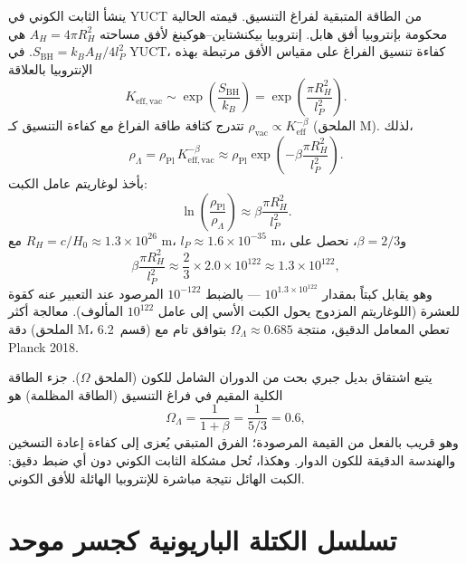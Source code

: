 \documentclass[12pt,a4paper]{article}
\begin{document}
	ينشأ الثابت الكوني في YUCT من الطاقة المتبقية لفراغ التنسيق. قيمته الحالية محكومة بإنتروبيا أفق هابل. إنتروبيا بيكنشتاين–هوكينغ لأفق مساحته \(A_H = 4\pi R_H^2\) هي \(S_{\mathrm{BH}} = k_B A_H / 4l_P^2\). في YUCT، كفاءة تنسيق الفراغ على مقياس الأفق مرتبطة بهذه الإنتروبيا بالعلاقة
	\begin{equation}
		K_{\mathrm{eff, vac}} \sim \exp\left( \frac{S_{\mathrm{BH}}}{k_B} \right) = \exp\left( \frac{\pi R_H^2}{l_P^2} \right).
	\end{equation}
	تتدرج كثافة طاقة الفراغ مع كفاءة التنسيق كـ \(\rho_{\mathrm{vac}} \propto K_{\mathrm{eff}}^{-\beta}\) (الملحق M). لذلك،
	\begin{equation}
		\rho_\Lambda = \rho_{\mathrm{Pl}} \, K_{\mathrm{eff, vac}}^{-\beta} \approx \rho_{\mathrm{Pl}} \exp\left( -\beta \frac{\pi R_H^2}{l_P^2} \right).
		\label{eq:lambda-suppression}
	\end{equation}
	بأخذ لوغاريتم عامل الكبت:
	\begin{equation}
		\ln\left( \frac{\rho_{\mathrm{Pl}}}{\rho_\Lambda} \right) \approx \beta \frac{\pi R_H^2}{l_P^2}.
	\end{equation}
	مع \(R_H = c / H_0 \approx 1.3 \times 10^{26}\) m، \(l_P \approx 1.6 \times 10^{-35}\) m، و\(\beta = 2/3\)، نحصل على
	\begin{equation}
		\beta \frac{\pi R_H^2}{l_P^2} \approx \frac{2}{3} \times 2.0 \times 10^{122} \approx 1.3 \times 10^{122},
	\end{equation}
	وهو يقابل كبتاً بمقدار \(10^{1.3 \times 10^{122}}\) — بالضبط \(10^{-122}\) المرصود عند التعبير عنه كقوة للعشرة (اللوغاريتم المزدوج يحول الكبت الأسي إلى عامل \(10^{122}\) المألوف). معالجة أكثر دقة (الملحق M، قسم~6.2) تعطي المعامل الدقيق، منتجة \(\Omega_\Lambda \approx 0.685\) بتوافق تام مع Planck 2018.
	
	يتبع اشتقاق بديل جبري بحت من الدوران الشامل للكون (الملحق \(\Omega\)). جزء الطاقة الكلية المقيم في فراغ التنسيق (الطاقة المظلمة) هو
	\begin{equation}
		\Omega_\Lambda = \frac{1}{1+\beta} = \frac{1}{5/3} = 0.6,
	\end{equation}
	وهو قريب بالفعل من القيمة المرصودة؛ الفرق المتبقي يُعزى إلى كفاءة إعادة التسخين والهندسة الدقيقة للكون الدوار. وهكذا، تُحل مشكلة الثابت الكوني دون أي ضبط دقيق: الكبت الهائل نتيجة مباشرة للإنتروبيا الهائلة للأفق الكوني.
	
	\section{تسلسل الكتلة الباريونية كجسر موحد}
	
\end{document}
